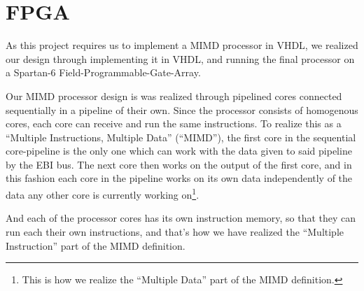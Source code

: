 \FloatBarrier
\chapter{FPGA}\label{chapter:fpga}

As this project requires us to implement a MIMD processor in VHDL, we realized
our design through implementing it in VHDL, and running the final processor on a
Spartan-6\cite{fpga-chip} Field-Programmable-Gate-Array.

Our MIMD processor design is was realized through pipelined cores connected
sequentially in a pipeline of their own. Since the processor consists of
homogenous cores, each core can receive and run the same instructions. To
realize this as a ``Multiple Instructions, Multiple Data'' (``MIMD''), the first
core in the sequential core-pipeline is the only one which can work with the
data given to said pipeline by the EBI bus. The next core then works on the
output of the first core, and in this fashion each core in the pipeline works on
its own data independently of the data any other core is currently working
on\footnote{This is how we realize the ``Multiple Data'' part of the MIMD
definition.}.

And each of the processor cores has its own instruction memory, so that they can
run each their own instructions, and that's how we have realized the ``Multiple
Instruction'' part of the MIMD definition.








